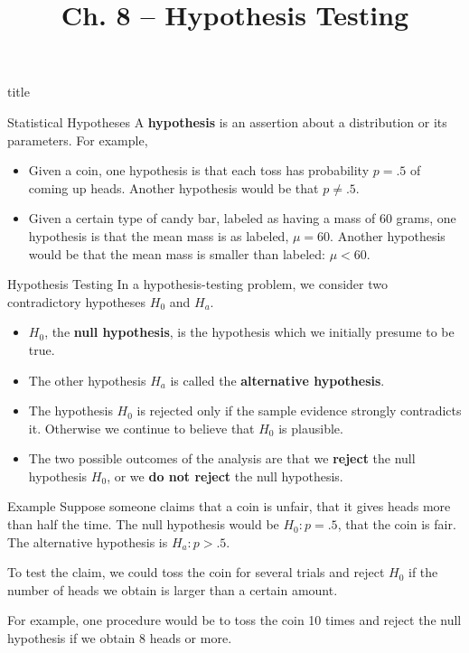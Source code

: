 \documentclass[handout]{beamer}
\title{Ch. 8 -- Hypothesis Testing}
\renewcommand{\emph}{\textbf}
\begin{document}
\begin{frame}
\begin{beamercolorbox}[rounded=true,wd=\textwidth,center]{title}
\inserttitle
\end{beamercolorbox}
\end{frame} 

\begin{frame}{Statistical Hypotheses}
A \emph{hypothesis} is an assertion about a distribution or its parameters. \pause For example,
\begin{itemize}
\item Given a coin, one hypothesis is that each toss has probability $p=.5$ of coming up heads. \pause Another hypothesis would be that $p\neq .5$.
\pause \item Given a certain type of candy bar, labeled as having a mass of 60 grams, one hypothesis is that the mean mass is as labeled, $\mu=60$. \pause Another hypothesis would be that the mean mass is smaller than labeled: $\mu<60$.
\end{itemize}
\end{frame}

\begin{frame}{Hypothesis Testing}
In a hypothesis-testing problem, we consider two contradictory hypotheses $H_0$ and $H_a$.
\begin{itemize}
\pause \item $H_0$, the \emph{null hypothesis}, is the hypothesis which we initially presume to be true.
\pause \item The other hypothesis $H_a$ is called the \emph{alternative hypothesis}.
\pause \item The hypothesis $H_0$ is rejected only if the sample evidence strongly contradicts it. Otherwise we continue to believe that $H_0$ is plausible.
\pause \item The two possible outcomes of the analysis are that we \emph{reject} the null hypothesis $H_0$, or we \emph{do not reject} the null hypothesis.
\end{itemize}
\end{frame}

\begin{frame}{Example}
Suppose someone claims that a coin is unfair, that it gives heads more than half the time. \pause The null hypothesis would be $H_0: p=.5$, that the coin is fair. \pause The alternative hypothesis is $H_a: p>.5$.

\vspace{.2cm}
\pause To test the claim, we could toss the coin for several trials and reject $H_0$ if the number of heads we obtain is larger than a certain amount. 

\vspace{.2cm}
\pause For example, one procedure would be to toss the coin 10 times and reject the null hypothesis if we obtain 8 heads or more.
\end{frame}
\end{document}
